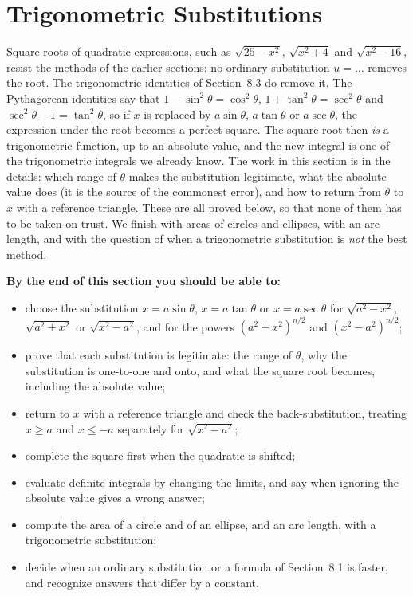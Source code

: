\documentclass[11pt]{article}
\begin{document}
\section{Trigonometric Substitutions}

\begin{guide}
Square roots of quadratic expressions, such as $\sqrt{25-x^2}$, $\sqrt{x^2+4}$ and $\sqrt{x^2-16}$, resist the methods of the earlier sections: no ordinary substitution $u=\dots$ removes the root. The trigonometric identities of Section~8.3 do remove it. The Pythagorean identities say that $1-\sin^2\theta=\cos^2\theta$, $1+\tan^2\theta=\sec^2\theta$ and $\sec^2\theta-1=\tan^2\theta$, so if $x$ is replaced by $a\sin\theta$, $a\tan\theta$ or $a\sec\theta$, the expression under the root becomes a perfect square. The square root then \emph{is} a trigonometric function, up to an absolute value, and the new integral is one of the trigonometric integrals we already know. The work in this section is in the details: which range of $\theta$ makes the substitution legitimate, what the absolute value does (it is the source of the commonest error), and how to return from $\theta$ to $x$ with a reference triangle. These are all proved below, so that none of them has to be taken on trust. We finish with areas of circles and ellipses, with an arc length, and with the question of when a trigonometric substitution is \emph{not} the best method.
\end{guide}

\textbf{By the end of this section you should be able to:}
\begin{itemize}
  \item choose the substitution $x=a\sin\theta$, $x=a\tan\theta$ or $x=a\sec\theta$ for $\sqrt{a^2-x^2}$, $\sqrt{a^2+x^2}$ or $\sqrt{x^2-a^2}$, and for the powers $(a^2\pm x^2)^{n/2}$ and $(x^2-a^2)^{n/2}$;
  \item prove that each substitution is legitimate: the range of $\theta$, why the substitution is one-to-one and onto, and what the square root becomes, including the absolute value;
  \item return to $x$ with a reference triangle and check the back-substitution, treating $x\ge a$ and $x\le-a$ separately for $\sqrt{x^2-a^2}$;
  \item complete the square first when the quadratic is shifted;
  \item evaluate definite integrals by changing the limits, and say when ignoring the absolute value gives a wrong answer;
  \item compute the area of a circle and of an ellipse, and an arc length, with a trigonometric substitution;
  \item decide when an ordinary substitution or a formula of Section~8.1 is faster, and recognize answers that differ by a constant.
\end{itemize}
\end{document}
